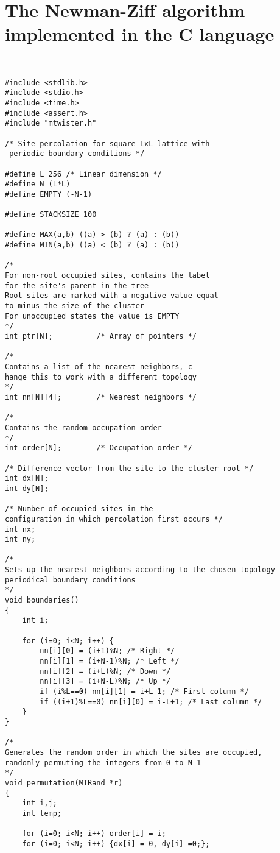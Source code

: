 \section{The Newman-Ziff algorithm implemented in the C language}
\label{sect:appendixA}


\begin{verbatim}


#include <stdlib.h>
#include <stdio.h>
#include <time.h>
#include <assert.h>
#include "mtwister.h"

/* Site percolation for square LxL lattice with
 periodic boundary conditions */

#define L 256 /* Linear dimension */
#define N (L*L)
#define EMPTY (-N-1)

#define STACKSIZE 100

#define MAX(a,b) ((a) > (b) ? (a) : (b))
#define MIN(a,b) ((a) < (b) ? (a) : (b))

/* 
For non-root occupied sites, contains the label 
for the site's parent in the tree
Root sites are marked with a negative value equal 
to minus the size of the cluster
For unoccupied states the value is EMPTY
*/
int ptr[N];          /* Array of pointers */

/*
Contains a list of the nearest neighbors, c
hange this to work with a different topology
*/
int nn[N][4];        /* Nearest neighbors */

/*
Contains the random occupation order  
*/
int order[N];        /* Occupation order */

/* Difference vector from the site to the cluster root */
int dx[N];
int dy[N];

/* Number of occupied sites in the 
configuration in which percolation first occurs */
int nx;
int ny;

/*
Sets up the nearest neighbors according to the chosen topology
periodical boundary conditions
*/
void boundaries()
{
    int i;

    for (i=0; i<N; i++) {
        nn[i][0] = (i+1)%N; /* Right */
        nn[i][1] = (i+N-1)%N; /* Left */
        nn[i][2] = (i+L)%N; /* Down */
        nn[i][3] = (i+N-L)%N; /* Up */
        if (i%L==0) nn[i][1] = i+L-1; /* First column */
        if ((i+1)%L==0) nn[i][0] = i-L+1; /* Last column */
    }
}

/*
Generates the random order in which the sites are occupied, 
randomly permuting the integers from 0 to N-1
*/
void permutation(MTRand *r)
{
    int i,j;
    int temp;

    for (i=0; i<N; i++) order[i] = i; 
    for (i=0; i<N; i++) {dx[i] = 0, dy[i] =0;}; 
    

\end{verbatim}
